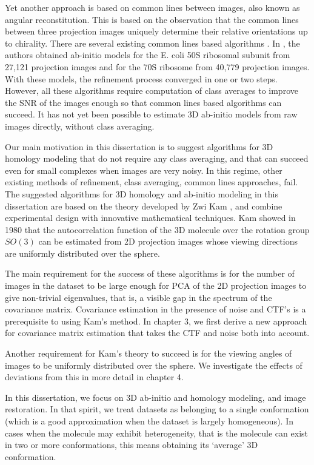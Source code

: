Yet another approach is based on common lines between images, also known as angular reconstitution. This is based on the observation that the common lines between three projection images uniquely determine their relative orientations up to chirality. There are several existing common lines based algorithms \cite{Penczek1996, farrow, mallick_cvpr, Singer2009, Shkolnisky2012ViewingDE}. In \cite{zhao}, the authors obtained ab-initio models for the E. coli 50S ribosomal subunit from 27,121 projection images and for the 70S ribosome from 40,779 projection images. With these models, the refinement process converged in one or two steps. However, all these algorithms require computation of class averages to improve the SNR of the images enough so that common lines based algorithms can succeed. It has not yet been possible to estimate 3D ab-initio models from raw images directly, without class averaging.

Our main motivation in this dissertation is to suggest algorithms for 3D homology modeling that do not require any class averaging, and that can succeed even for small complexes when images are very noisy. In this regime, other existing methods of refinement, class averaging, common lines approaches, fail. The suggested algorithms for 3D homology and ab-initio modeling in this dissertation are based on the theory developed by Zwi Kam \cite{kam1980}, and combine experimental design with innovative mathematical techniques. Kam showed in 1980 that the autocorrelation function of the 3D molecule over the rotation
group $SO(3)$ can be estimated from 2D projection images
whose viewing directions are uniformly distributed over the
sphere.

The main requirement for the success of these algorithms is for the number of images in the dataset to be large enough for PCA of the 2D projection images to give non-trivial eigenvalues, that is, a visible gap in the spectrum of the covariance matrix. Covariance estimation in the presence of noise and CTF's is a prerequisite to using Kam's method. In chapter 3, we first derive a new approach for covariance matrix estimation that takes the CTF and noise both into account.

Another requirement for Kam's theory to succeed is for the viewing angles of images to be uniformly distributed over the sphere. We investigate the effects of deviations from this in more detail in chapter 4.

In this dissertation, we focus on 3D ab-initio and homology modeling, and image restoration. In that spirit, we treat datasets as belonging to a single conformation (which is a good approximation when the dataset is largely homogeneous). In cases when the molecule may exhibit heterogeneity, that is the molecule can exist in two or more conformations, this  means obtaining its `average' 3D conformation. 

